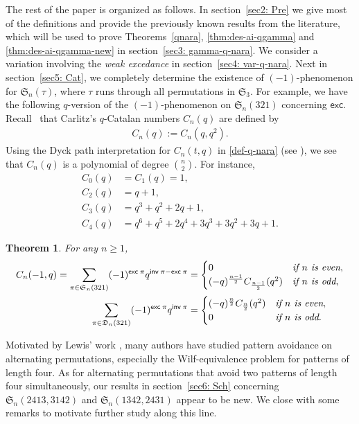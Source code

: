 \documentclass[12pt,reqno]{amsart}
\numberwithin{equation}{section}
\theoremstyle{plain}
\newtheorem{theorem}{Theorem}[section]
\theoremstyle{definition}
\def\S{\mathfrak{S}}
\def\D{\mathfrak{D}}
\def\exc{\mathsf{exc}}
\def\inv{\mathsf{inv}}
\begin{document}
The rest of the paper is organized as follows. In section~\ref{sec2: Pre} we give most of the definitions and provide the previously known results from the literature, which will be used to prove Theorems~\ref{qnara}, \ref{thm:des-ai-qgamma} and \ref{thm:des-ai-qgamma-new} in section~\ref{sec3: gamma-q-nara}. We consider a variation involving the {\em weak excedance} in section~\ref{sec4: var-q-nara}. Next in section~\ref{sec5: Cat}, we completely determine the existence of $(-1)$-phenomenon for $\S_n(\tau)$, where $\tau$ runs through all permutations in $\S_3$. For example, we have the following $q$-version of the $(-1)$-phenomenon on $\S_n(321)$ concerning $\exc$. Recall~\cite{BP14} that  Carlitz's $q$-Catalan numbers $C_n(q)$ are defined by
\begin{align}
{C}_n(q):=C_n(q,q^2).
\end{align}
Using the  Dyck path interpretation for $C_n(t,q)$ in \eqref{def-q-nara} (see \cite{Fl80}),  we see that $C_n(q)$ is a polynomial of degree $\binom{n}{2}$. For instance,
\begin{align*}
C_0(q) &=C_1(q)=1,\\
C_2(q) &=q+1,\\
C_3(q) &= q^3+q^2+2q+1,\\
C_4(q) &=q^6+q^5+2q^4+3q^3+3q^2+3q+1.
\end{align*}
\begin{theorem}\label{q-nara}
For any $n\ge 1$,
\begin{align}
\label{q-nara-odd}
C_n(-1,q)=\sum_{\pi\in\S_n(321)}(-1)^{\exc\:\pi}q^{\inv\:\pi-\exc\:\pi}&=\begin{cases}0 & \emph{if $n$ is even},\\
(-q)^{\frac{n-1}{2}}C_{\frac{n-1}{2}}(q^2) & \emph{if $n$ is odd},
\end{cases}\\
\label{q-nara-even}
\sum\limits_{\pi\in\D_n(321)}(-1)^{\exc\:\pi}q^{\inv\:\pi}
&=\begin{cases}(-q)^{\frac{n}{2}}C_{\frac{n}{2}}(q^2) & \emph{if $n$ is even},\\
0 & \emph{if $n$ is odd}.
\end{cases}
\end{align}
\end{theorem}

Motivated by Lewis' work \cite{Lew,Lew1,Lew2,Lew3}, many authors \cite{Bon,CCZ,Yan,XY,MW} have studied pattern avoidance on alternating permutations, especially the Wilf-equivalence problem for patterns of length four. As for alternating permutations that avoid two patterns of length four simultaneously, our results in section~\ref{sec6: Sch} concerning $\S_n(2413,3142)$ and $\S_n(1342,2431)$ appear to be new. We close with some remarks to motivate further study along this line.
\end{document}
